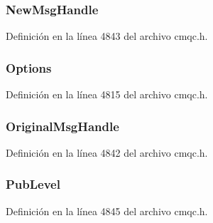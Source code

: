 \subsubsection[{New\+Msg\+Handle}]{ New\+Msg\+Handle}\label{structtag_m_q_p_m_o_a9daf07c64f152de0db1a09b8033a87d5}


Definición en la línea 4843 del archivo cmqc.\+h.

\hypertarget{structtag_m_q_p_m_o_ad7aff2d6c6044809464380998d24ec5c}{}
\subsubsection[{Options}]{ Options}\label{structtag_m_q_p_m_o_ad7aff2d6c6044809464380998d24ec5c}


Definición en la línea 4815 del archivo cmqc.\+h.

\hypertarget{structtag_m_q_p_m_o_ae085f237b8d312cc17a08ee5b890698b}{}
\subsubsection[{Original\+Msg\+Handle}]{ Original\+Msg\+Handle}\label{structtag_m_q_p_m_o_ae085f237b8d312cc17a08ee5b890698b}


Definición en la línea 4842 del archivo cmqc.\+h.

\hypertarget{structtag_m_q_p_m_o_ab5df476923b8b98b937d42b572a20e07}{}
\subsubsection[{Pub\+Level}]{ Pub\+Level}\label{structtag_m_q_p_m_o_ab5df476923b8b98b937d42b572a20e07}


Definición en la línea 4845 del archivo cmqc.\+h.

\hypertarget{structtag_m_q_p_m_o_aea1b77e1a6f2b6f18526055315f8b175}{}
